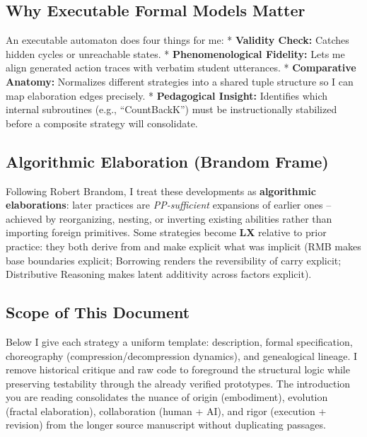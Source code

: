 \documentclass[12pt]{book}
\begin{document}
\subsection{Why Executable Formal Models
Matter}\label{why-executable-formal-models-matter}

An executable automaton does four things for me: * \textbf{Validity
Check:} Catches hidden cycles or unreachable states. *
\textbf{Phenomenological Fidelity:} Lets me align generated action
traces with verbatim student utterances. * \textbf{Comparative Anatomy:}
Normalizes different strategies into a shared tuple structure so I can
map elaboration edges precisely. * \textbf{Pedagogical Insight:}
Identifies which internal subroutines (e.g., ``CountBackK'') must be
instructionally stabilized before a composite strategy will consolidate.

\subsection{Algorithmic Elaboration (Brandom
Frame)}\label{algorithmic-elaboration-brandom-frame}

Following Robert Brandom, I treat these developments as
\textbf{algorithmic elaborations}: later practices are
\emph{PP-sufficient} expansions of earlier ones -- achieved by
reorganizing, nesting, or inverting existing abilities rather than
importing foreign primitives. Some strategies become \textbf{LX}
relative to prior practice: they both derive from and make explicit what
was implicit (RMB makes base boundaries explicit; Borrowing renders the
reversibility of carry explicit; Distributive Reasoning makes latent
additivity across factors explicit).

\subsection{Scope of This Document}\label{scope-of-this-document}

Below I give each strategy a uniform template: description, formal
specification, choreography (compression/decompression dynamics), and
genealogical lineage. I remove historical critique and raw code to
foreground the structural logic while preserving testability through the
already verified prototypes. The introduction you are reading
consolidates the nuance of origin (embodiment), evolution (fractal
elaboration), collaboration (human + AI), and rigor (execution +
revision) from the longer source manuscript without duplicating
passages.
\end{document}
